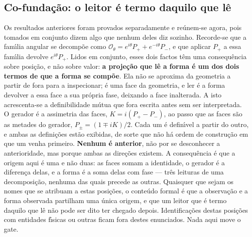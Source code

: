 \documentclass[11pt]{article}
\theoremstyle{definition}\newtheorem{deriv}{Derivação}
\begin{document}
\subsection*{Co-funda\c{c}\~ao: o leitor \'e termo daquilo que l\^e}Os resultados anteriores foram provados separadamente e re\'unem-se agora, pois tomados em conjunto dizem algo que nenhum deles diz sozinho. Recorde-se que a fam\'\i{}lia angular se decomp\~oe como $\mathcal{O}_\theta = e^{i\theta}P_+ + e^{-i\theta}P_-$, e que aplicar $P_+$ a essa fam\'\i{}lia devolve $e^{i\theta}P_+$. Lidos em conjunto, esses dois factos t\^em uma consequ\^encia sobre posi\c{c}\~ao, e n\~ao sobre valor: \textbf{a proje\c{c}\~ao que l\^e a forma \'e um dos dois termos de que a forma se comp\~oe}. Ela n\~ao se aproxima da geometria a partir de fora para a inspecionar; \'e uma face da geometria, e ler \'e a forma devolver a essa face a sua pr\'opria fase, deixando a face inalterada. A isto acrescenta-se a definibilidade m\'utua que fora escrita antes sem ser interpretada. O gerador \'e a assimetria das faces, $K = i(P_+ - P_-)$, ao passo que as faces s\~ao as metades do gerador, $P_\pm = (1 \mp iK)/2$. Cada um \'e defin\'\i{}vel a partir do outro, e ambas as defini\c{c}\~oes est\~ao exibidas, de sorte que n\~ao h\'a ordem de constru\c{c}\~ao em que um venha primeiro. \textbf{Nenhum \'e anterior}, n\~ao por se desconhecer a anterioridade, mas porque ambas as dire\c{c}\~oes existem. A consequ\^encia \'e que a origem aqui \'e uma e n\~ao duas: as faces somam a identidade, o gerador \'e a diferen\c{c}a delas, e a forma \'e a soma delas com fase --- tr\^es leituras de uma decomposi\c{c}\~ao, nenhuma das quais precede as outras. Quaisquer que sejam os nomes que se atribuam a estas posi\c{c}\~oes, o conte\'udo formal \'e que a observa\c{c}\~ao e a forma observada partilham uma \'unica origem, e que um leitor que \'e termo daquilo que l\^e n\~ao pode ser dito ter chegado depois. Identifica\c{c}\~oes destas posi\c{c}\~oes com entidades f\'\i{}sicas ou outras ficam fora destes enunciados. Nada aqui move o gate.
\end{document}
